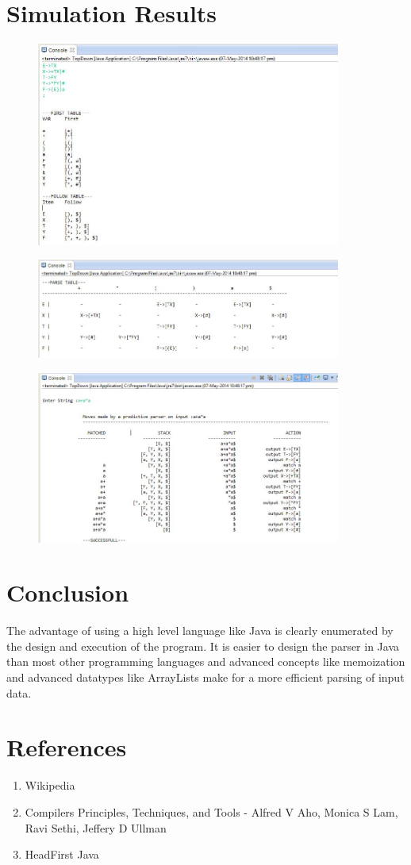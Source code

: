 \documentclass[12pt]{article}
\begin{document}
\section{Simulation Results}
\begin{figure}[ht!]
\centering
\includegraphics[width=100mm]{TDP1.jpg}
\end{figure}
\begin{figure}[ht!]
\centering
\includegraphics[width=100mm]{TDP2.jpg}
\end{figure}
\begin{figure}[ht!]
\centering
\includegraphics[width=100mm]{TDP3.jpg}
\end{figure}
\section{Conclusion}
The advantage of using a high level language like Java is clearly enumerated by the design and execution of the program. It is easier to design the parser in Java than most other programming languages and advanced concepts like memoization and advanced datatypes like ArrayLists make for a more efficient parsing of input data.
\section{References}
\begin{enumerate}
\item Wikipedia
\item Compilers Principles, Techniques, and Tools - Alfred V Aho, Monica S Lam, Ravi Sethi, Jeffery D Ullman
\item HeadFirst Java
\end{enumerate}
\end{document}
